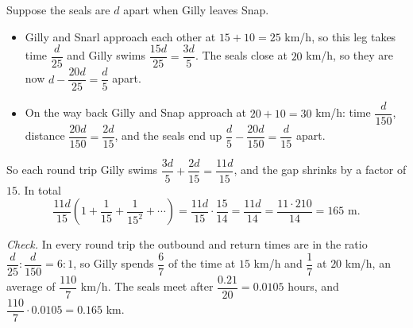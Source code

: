 Suppose the seals are $d$ apart when Gilly leaves Snap.
\begin{itemize}
\item Gilly and Snarl approach each other at $15+10=25$ km/h, so this leg takes time $\dfrac{d}{25}$ and Gilly swims $\dfrac{15d}{25}=\dfrac{3d}{5}$. The seals close at $20$ km/h, so they are now $d-\dfrac{20d}{25}=\dfrac d5$ apart.
\item On the way back Gilly and Snap approach at $20+10=30$ km/h: time $\dfrac{d}{150}$, distance $\dfrac{20d}{150}=\dfrac{2d}{15}$, and the seals end up $\dfrac d5-\dfrac{20d}{150}=\dfrac{d}{15}$ apart.
\end{itemize}
So each round trip Gilly swims $\dfrac{3d}{5}+\dfrac{2d}{15}=\dfrac{11d}{15}$, and the gap shrinks by a factor of $15$. In total
\[\dfrac{11d}{15}\left(1+\dfrac1{15}+\dfrac{1}{15^2}+\cdots\right)=\dfrac{11d}{15}\cdot\dfrac{15}{14}=\dfrac{11d}{14}=\dfrac{11\cdot210}{14}=\boxed{165\text{ m}}.\]

\emph{Check.} In every round trip the outbound and return times are in the ratio $\dfrac{d}{25}:\dfrac{d}{150}=6:1$, so Gilly spends $\dfrac67$ of the time at $15$ km/h and $\dfrac17$ at $20$ km/h, an average of $\dfrac{110}{7}$ km/h. The seals meet after $\dfrac{0.21}{20}=0.0105$ hours, and $\dfrac{110}{7}\cdot0.0105=0.165$ km.
